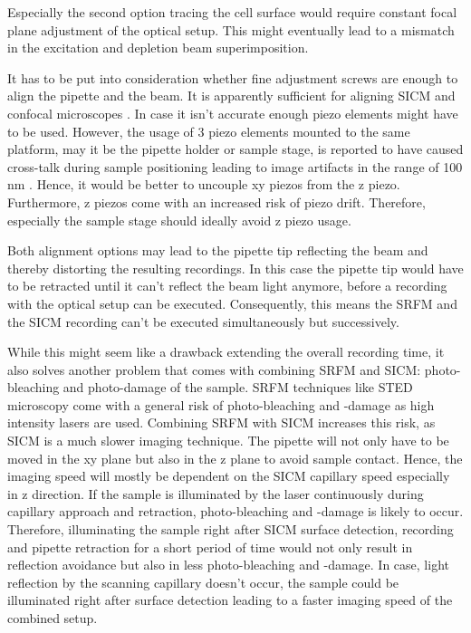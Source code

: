 Especially the second option tracing the cell surface would require constant
focal plane adjustment of the optical setup. This might eventually lead to a
mismatch in the excitation and depletion beam superimposition.

It has to be put into consideration whether fine adjustment screws are enough
to align the pipette and the beam. It is apparently sufficient for aligning
SICM and confocal microscopes \cite{Gorelik2002a}\cite{Shevchuk2008}. 
In case it isn't accurate enough piezo elements might have to be used. 
However, the usage of 3 piezo elements mounted to the same platform, may it be
the pipette holder or sample stage, is reported to have caused cross-talk during
sample positioning leading to image artifacts in the range of 100 nm 
\cite{Shevchuk2013}. Hence, it would be better to uncouple xy piezos from 
the z piezo. Furthermore, z piezos come with an increased risk of piezo drift. 
Therefore, especially the sample stage should ideally avoid z piezo usage.

Both alignment options may lead to the pipette tip reflecting the beam and
thereby distorting the resulting recordings. In this case the pipette tip
would have to be retracted until it can't reflect the beam light anymore,
before a recording with the optical setup can be executed. Consequently, this
means the SRFM and the SICM recording can't be executed simultaneously but
successively.

While this might seem like a drawback extending the overall recording time, it
also solves another problem that comes with combining SRFM and SICM:
photo-bleaching and photo-damage of the sample. SRFM techniques like STED
microscopy come with a general risk of photo-bleaching and -damage as high
intensity lasers are used. Combining SRFM with SICM increases this risk,
as SICM is a much slower imaging technique. The pipette will not only have to
be moved in the xy plane but also in the z plane to avoid sample
contact. Hence, the imaging speed will mostly be dependent on the SICM
capillary speed especially in z direction. If the sample is illuminated by the
laser continuously during capillary approach and retraction, photo-bleaching
and -damage is likely to occur. Therefore, illuminating the sample right after
SICM surface detection, recording and pipette retraction for a short period of
time would not only result in reflection avoidance but also in less
photo-bleaching and -damage. In case, light reflection by the scanning
capillary doesn't occur, the sample could be illuminated right after surface
detection leading to a faster imaging speed of the combined setup.

